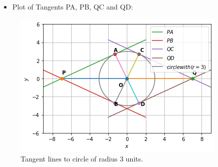 \documentclass[journal,12pt,twocolumn]{IEEEtran}
\begin{document}
 \begin{itemize}
     \item Plot of Tangents PA, PB, QC and QD:
 \end{itemize}
\begin{figure}[H]
    \centering
    \includegraphics[width=\columnwidth]{FIGURE3.png}
    \caption{Tangent lines to circle of radius 3 units.}
    \label{fig:Tangent lines to circle of radius 3 units.}
\end{figure}
\end{document}
